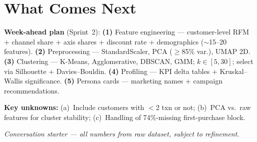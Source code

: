\documentclass[9pt,a4paper]{article}
\begin{document}
\section{What Comes Next}

\textbf{Week-ahead plan} (Sprint~2):
\textbf{(1)} Feature engineering --- customer-level RFM + channel share + axis shares + discount rate + demographics ($\sim$15--20 features).
\textbf{(2)} Preprocessing --- StandardScaler, PCA ($\geq$85\% var.), UMAP 2D.
\textbf{(3)} Clustering --- K-Means, Agglomerative, DBSCAN, GMM; $k\in[5,30]$; select via Silhouette + Davies--Bouldin.
\textbf{(4)} Profiling --- KPI delta tables + Kruskal--Wallis significance.
\textbf{(5)} Persona cards --- marketing names + campaign recommendations.

\textbf{Key unknowns:}
(a)~Include customers with $<$2 txn or not;
(b)~PCA vs.\ raw features for cluster stability;
(c)~Handling of 74\%-missing first-purchase block.

\vfill
\begin{center}
\scriptsize\color{gray}\itshape Conversation starter --- all numbers from raw dataset, subject to refinement.
\end{center}
\end{document}
